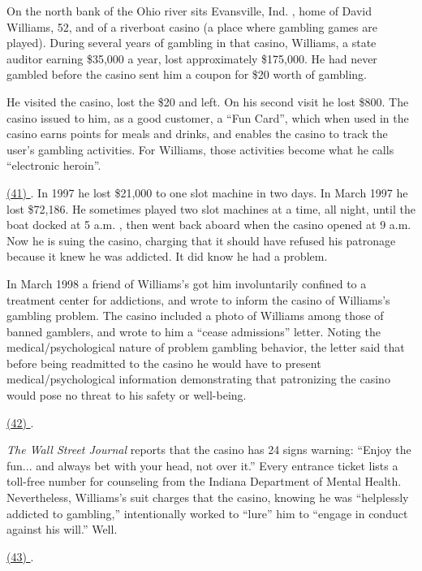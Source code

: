 
\qquad On the north bank of the Ohio river sits Evansville, Ind. , home of David Williams, 52, and of a riverboat casino (a place where gambling games are played). During several years of gambling in that casino, Williams, a state auditor earning \$35,000 a year, lost approximately \$175,000. He had never gambled before the casino sent him a coupon for \$20 worth of gambling.

\qquad He visited the casino, lost the \$20 and left. On his second visit he lost \$800. The casino issued to him, as a good customer, a ``Fun Card'', which when used in the casino earns points for meals and drinks, and enables the casino to track the user's gambling activities. For Williams, those activities become what he calls ``electronic heroin''.

\qquad \ul{(41) \qquad\qquad}. In 1997 he lost \$21,000 to one slot machine in two days. In March 1997 he lost \$72,186. He sometimes played two slot machines at a time, all night, until the boat docked at 5 a.m. , then went back aboard when the casino opened at 9 a.m. Now he is suing the casino, charging that it should have refused his patronage because it knew he was addicted. It did know he had a problem.

\qquad In March 1998 a friend of Williams's got him involuntarily confined to a treatment center for addictions, and wrote to inform the casino of Williams's gambling problem. The casino included a photo of Williams among those of banned gamblers, and wrote to him a ``cease admissions'' letter. Noting the medical/psychological nature of problem gambling behavior, the letter said that before being readmitted to the casino he would have to present medical/psychological information demonstrating that patronizing the casino would pose no threat to his safety or well-being.

\qquad \ul{(42) \qquad\qquad}.

\qquad \emph{The Wall Street Journal} reports that the casino has 24 signs warning: ``Enjoy the fun... and always bet with your head, not over it.'' Every entrance ticket lists a toll-free number for counseling from the Indiana Department of Mental Health. Nevertheless, Williams's suit charges that the casino, knowing he was ``helplessly addicted to gambling,'' intentionally worked to ``lure'' him to ``engage in conduct against his will.'' Well.

\qquad \ul{(43) \qquad\qquad}.

